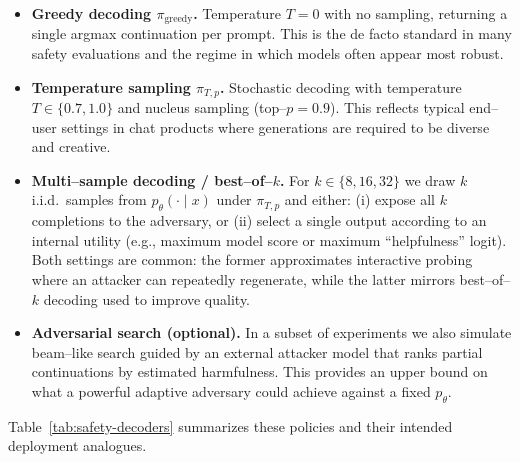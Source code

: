 \begin{itemize}[leftmargin=1.5em]
  \item \textbf{Greedy decoding $\pi_{\text{greedy}}$.}
  Temperature $T{=}0$ with no sampling, returning a single
  argmax continuation per prompt.
  This is the de facto standard in many safety evaluations and the
  regime in which models often appear most robust.

  \item \textbf{Temperature sampling $\pi_{T,p}$.}
  Stochastic decoding with temperature $T \in \{0.7, 1.0\}$ and
  nucleus sampling (top–$p{=}0.9$).
  This reflects typical end–user settings in chat products where
  generations are required to be diverse and creative.

  \item \textbf{Multi–sample decoding / best–of–$k$.}
  For $k \in \{8,16,32\}$ we draw $k$ i.i.d.\ samples from
  $p_\theta(\cdot \mid x)$ under $\pi_{T,p}$ and either:
  (i) expose all $k$ completions to the adversary, or
  (ii) select a single output according to an internal utility
  (e.g., maximum model score or maximum ``helpfulness'' logit).
  Both settings are common: the former approximates interactive
  probing where an attacker can repeatedly regenerate, while the latter
  mirrors best–of–$k$ decoding used to improve quality.

  \item \textbf{Adversarial search (optional).}
  In a subset of experiments we also simulate beam–like search
  guided by an external attacker model that ranks partial continuations
  by estimated harmfulness.
  This provides an upper bound on what a powerful adaptive adversary
  could achieve against a fixed $p_\theta$.
\end{itemize}

Table~\ref{tab:safety-decoders} summarizes these policies and their
intended deployment analogues.

